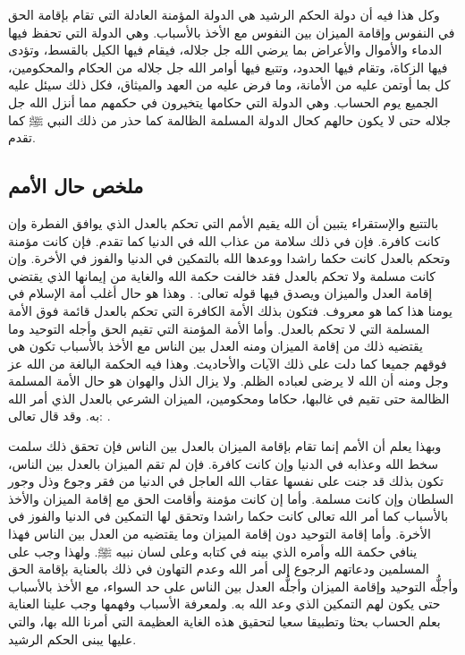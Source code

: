 وكل هذا فيه أن دولة الحكم الرشيد هي الدولة المؤمنة العادلة التي تقام بإقامة الحق في النفوس وإقامة الميزان بين النفوس مع الأخذ بالأسباب. وهي الدولة التي تحفظ فيها الدماء والأموال والأعراض بما يرضي الله جل جلاله، فيقام فيها الكيل بالقسط، وتؤدى فيها الزكاة، وتقام فيها الحدود، وتتبع فيها أوامر الله جل جلاله من الحكام والمحكومين، كل بما أوتمن عليه من الأمانة، وما فرض عليه من العهد والميثاق، فكل ذلك سيئل عليه الجميع يوم الحساب. وهي الدولة التي حكامها يتخيرون في حكمهم مما أنزل الله جل جلاله حتى لا يكون حالهم كحال الدولة المسلمة الظالمة كما حذر من ذلك النبي ﷺ  كما تقدم. 

\subsection{ملخص حال الأمم}

بالتتبع والإستقراء يتبين أن الله يقيم الأمم التي تحكم بالعدل الذي يوافق الفطرة وإن كانت كافرة. فإن في ذلك سلامة من عذاب الله في الدنيا كما تقدم. فإن كانت مؤمنة وتحكم بالعدل كانت حكما راشدا ووعدها الله بالتمكين في الدنيا والفوز في الأخرة. وإن كانت مسلمة ولا تحكم بالعدل فقد خالفت حكمة الله والغاية من إيمانها الذي يقتضي إقامة العدل والميزان ويصدق فيها قوله تعالى:
\quranayah*[49][14]{\footnotesize \surahname*[49]}. وهذا هو حال أغلب أمة الإسلام في يومنا هذا كما هو معروف. فتكون بذلك الأمة الكافرة التي تحكم بالعدل قائمة فوق الأمة المسلمة التي لا تحكم بالعدل. وأما الأمة المؤمنة التي تقيم الحق وأجله التوحيد وما يقتضيه ذلك من إقامة الميزان ومنه العدل بين الناس مع الأخذ بالأسباب تكون هي فوقهم جميعا كما دلت على ذلك الآيات والأحاديث. وهذا فيه الحكمة البالغة من الله عز وجل ومنه أن الله لا يرضى لعباده الظلم. ولا يزال الذل والهوان هو حال الأمة المسلمة الظالمة حتى تقيم في غالبها، حكاما ومحكومين، الميزان الشرعي بالعدل الذي أمر الله به. وقد قال تعالى:
\quranayah*[13][11][12]{\footnotesize \surahname*[13]}.

وبهذا يعلم أن الأمم إنما تقام بإقامة الميزان بالعدل بين الناس فإن تحقق ذلك سلمت سخط الله وعذابه في الدنيا وإن كانت كافرة. فإن لم تقم الميزان بالعدل بين الناس، تكون بذلك قد جنت على نفسها عقاب الله العاجل في الدنيا من فقر وجوع وذل وجور السلطان وإن كانت مسلمة. وأما إن كانت مؤمنة وأقامت الحق مع إقامة الميزان والأخذ بالأسباب كما أمر الله تعالى كانت حكما راشدا وتحقق لها التمكين في الدنيا والفوز في الأخرة. وأما إقامة التوحيد دون إقامة الميزان وما يقتضيه من العدل بين الناس فهذا ينافي حكمة الله وأمره الذي بينه في كتابه وعلى لسان نبيه ﷺ. ولهذا وجب على المسلمين ودعاتهم الرجوع إلى أمر الله وعدم التهاون في ذلك بالعناية بإقامة الحق وأجلُّه التوحيد وإقامة الميزان وأجلُّه العدل بين الناس على حد السواء، مع الأخذ بالأسباب حتى يكون لهم التمكين الذي وعد الله به. ولمعرفة الأسباب وفهمها وجب علينا العناية بعلم الحساب بحثا وتطبيقا سعيا لتحقيق هذه الغاية العظيمة التي أمرنا الله بها، والتي عليها يبنى الحكم الرشيد.

